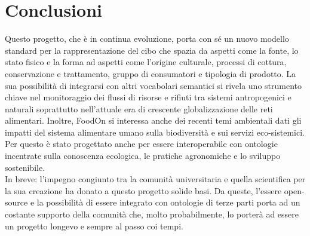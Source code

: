 \chapter{Conclusioni}
Questo progetto, che \`e in continua evoluzione, porta con s\'e un nuovo modello standard per la rappresentazione del cibo che spazia da aspetti come la fonte, lo stato fisico e la forma ad aspetti come l'origine culturale, processi di cottura, conservazione e trattamento, gruppo di consumatori e tipologia di prodotto.
La sua possibilit\`a di integrarsi con altri vocabolari semantici si rivela uno strumento chiave nel monitoraggio dei flussi di risorse e rifiuti tra sistemi antropogenici e naturali soprattutto nell'attuale era di crescente globalizzazione delle reti alimentari.
Inoltre, FoodOn si interessa anche dei recenti temi ambientali dati gli impatti del sistema alimentare umano sulla biodiversit\`a e sui servizi eco-sistemici. Per questo \`e stato progettato anche per essere interoperabile con ontologie incentrate sulla conoscenza ecologica, le pratiche agronomiche e lo sviluppo sostenibile.\\

In breve: l'impegno congiunto tra la comunit\`a universitaria e quella scientifica per la sua creazione ha donato a questo progetto solide basi.
Da queste, l'essere open-source e la possibilit\`a di essere integrato con ontologie di terze parti porta ad un costante supporto della comunit\`a che, molto probabilmente, lo porter\`a ad essere un progetto longevo e sempre al passo coi tempi.